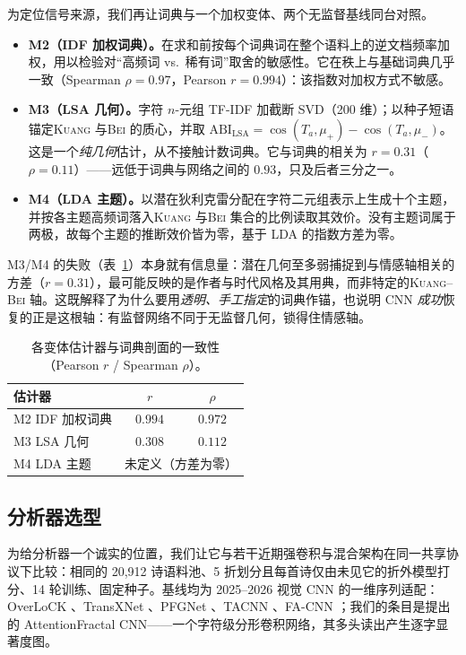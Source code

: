 \documentclass[11pt]{article}
\begin{document}
为定位信号来源，我们再让词典与一个加权变体、两个无监督基线同台对照。
\begin{itemize}
\item \textbf{M2（IDF 加权词典）。}在求和前按每个词典词在整个语料上的逆文档频率加权，用以检验对“高频词 vs.\ 稀有词”取舍的敏感性。它在秩上与基础词典几乎一致（Spearman $\rho{=}0.97$，Pearson $r{=}0.994$）：该指数对加权方式不敏感。
\item \textbf{M3（LSA 几何）。}字符 $n$-元组 TF-IDF 加截断 SVD（200 维）；以种子短语锚定\textsc{Kuang} 与\textsc{Bei} 的质心，并取 $\mathrm{ABI}_{\mathrm{LSA}}{=}\cos(T_a,\mu_+){-}\cos(T_a,\mu_-)$。这是一个\emph{纯几何}估计，从不接触计数词典。它与词典的相关为 $r{=}0.31$（$\rho{=}0.11$）——远低于词典与网络之间的 $0.93$，只及后者三分之一。
\item \textbf{M4（LDA 主题）。}以潜在狄利克雷分配在字符二元组表示上生成十个主题，并按各主题高频词落入\textsc{Kuang} 与\textsc{Bei} 集合的比例读取其效价。没有主题词属于两极，故每个主题的推断效价皆为零，基于 LDA 的指数方差为零。
\end{itemize}
M3/M4 的失败（表~\ref{tab:agree}）本身就有信息量：潜在几何至多弱捕捉到与情感轴相关的方差（$r{=}0.31$），最可能反映的是作者与时代风格及其用典，而非特定的\textsc{Kuang}--\textsc{Bei} 轴。这既解释了为什么要用\emph{透明、手工指定}的词典作锚，也说明 CNN \emph{成功}恢复的正是这根轴：有监督网络不同于无监督几何，锁得住情感轴。

\begin{table}[H]
\centering\small
\caption{各变体估计器与词典剖面的一致性（Pearson $r$ / Spearman $\rho$）。}
\label{tab:agree}
\begin{tabular}{lcc}
\toprule
估计器 & $r$ & $\rho$\\
\midrule
M2 IDF 加权词典 & $0.994$ & $0.972$\\
M3 LSA 几何 & $0.308$ & $0.112$\\
M4 LDA 主题 & \multicolumn{2}{c}{未定义（方差为零）}\\
\bottomrule
\end{tabular}
\end{table}

\subsection{分析器选型}
\label{sec:extbench}

为给分析器一个诚实的位置，我们让它与若干近期强卷积与混合架构在同一共享协议下比较：相同的 20{,}912 诗语料池、5 折划分且每首诗仅由未见它的折外模型打分、14 轮训练、固定种子。基线均为 2025–2026 视觉 CNN 的一维序列适配：OverLoCK \citep{overlock2025}、TransXNet \citep{transxnet2025}、PFGNet \citep{pfgn2026}、TACNN \citep{tacnn2026}、FA-CNN \citep{facnn2026}；我们的条目是提出的 AttentionFractal CNN——一个字符级分形卷积网络，其多头读出产生逐字显著度图。
\end{document}
